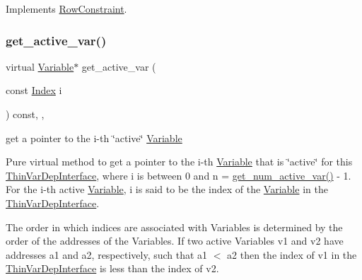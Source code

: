 Implements \mbox{\hyperlink{class_s_m_spp__di__unipi__it_1_1_row_constraint_a504d4e3e174c7a518cc66156a8a45ce5}{Row\+Constraint}}.

\mbox{\label{class_s_m_spp__di__unipi__it_1_1_one_var_constraint_a8599e4f65a8e9750fa7020ff2f50161f}} 
\subsubsection{\texorpdfstring{get\+\_\+active\+\_\+var()}{get\_active\_var()}}
{\footnotesize\ttfamily virtual \mbox{\hyperlink{class_s_m_spp__di__unipi__it_1_1_variable}{Variable}}$\ast$ get\+\_\+active\+\_\+var (\begin{DoxyParamCaption}\item[{const \mbox{\hyperlink{group___thin_var_dep_interface___c_l_a_s_s_e_s_gad53d6229d7ec28555a9c9c2fd9abf773}{Index}}}]{i }\end{DoxyParamCaption}) const\hspace{0.3cm}{\ttfamily [inline]}, {\ttfamily [override]}, {\ttfamily [virtual]}}



get a pointer to the i-\/th \char`\"{}active\char`\"{} \mbox{\hyperlink{class_s_m_spp__di__unipi__it_1_1_variable}{Variable}} 

Pure virtual method to get a pointer to the i-\/th \mbox{\hyperlink{class_s_m_spp__di__unipi__it_1_1_variable}{Variable}} that is \char`\"{}active\char`\"{} for this \mbox{\hyperlink{class_s_m_spp__di__unipi__it_1_1_thin_var_dep_interface}{Thin\+Var\+Dep\+Interface}}, where i is between 0 and n = \mbox{\hyperlink{class_s_m_spp__di__unipi__it_1_1_one_var_constraint_acc8ac3c57cc2c71ac3fe6c409fe53074}{get\+\_\+num\+\_\+active\+\_\+var()}} -\/ 1. For the i-\/th active \mbox{\hyperlink{class_s_m_spp__di__unipi__it_1_1_variable}{Variable}}, i is said to be the index of the \mbox{\hyperlink{class_s_m_spp__di__unipi__it_1_1_variable}{Variable}} in the \mbox{\hyperlink{class_s_m_spp__di__unipi__it_1_1_thin_var_dep_interface}{Thin\+Var\+Dep\+Interface}}.

The order in which indices are associated with Variables is determined by the order of the addresses of the Variables. If two active Variables v1 and v2 have addresses a1 and a2, respectively, such that a1 $<$ a2 then the index of v1 in the \mbox{\hyperlink{class_s_m_spp__di__unipi__it_1_1_thin_var_dep_interface}{Thin\+Var\+Dep\+Interface}} is less than the index of v2.

